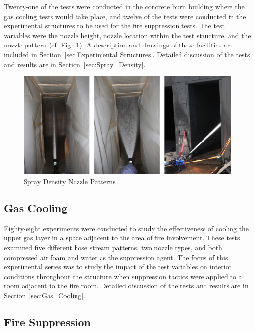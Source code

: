 \documentclass[12pt,oneside]{book}
\begin{document}
Twenty-one of the tests were conducted in the concrete burn building where the gas cooling tests would take place, and twelve of the tests were conducted in the experimental structures to be used for the fire suppression tests. The test variables were the nozzle height, nozzle location within the test structure, and the nozzle pattern (cf. Fig.~\ref{fig:Spray_Density_Nozzle_Patterns}). A description and drawings of these facilities are included in Section~\ref{sec:Experimental Structures}. Detailed discussion of the tests and results are in Section~\ref{sec:Spray_Density}.

\begin{figure}[!ht]
	\includegraphics[width=6in]{../Figures/Pictures/Flows}
	\caption{Spray Density Nozzle Patterns}
	\label{fig:Spray_Density_Nozzle_Patterns}
\end{figure}

\subsection{Gas Cooling}
\label{sec:desc_Gas_Cooling}

Eighty-eight experiments were conducted to study the effectiveness of cooling the upper gas layer in a space adjacent to the area of fire involvement. These tests examined five different hose stream patterns, two nozzle types, and both compressed air foam and water as the suppression agent. The focus of this experimental series was to study the impact of the test variables on interior conditions throughout the structure when suppression tactics were applied to a room adjacent to the fire room. Detailed discussion of the tests and results are in Section~\ref{sec:Gas_Cooling}.

\subsection{Fire Suppression}
\label{sec:desc_Fire_Suppression}
\end{document}
